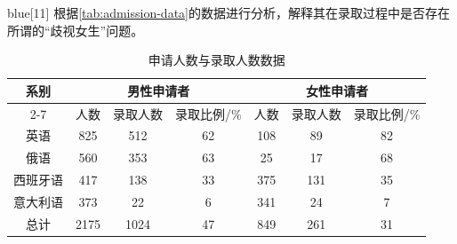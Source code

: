 \documentclass[12pt,onecolumn]{ctexrep}
\begin{document}
\vspace{1em}
\begin{mybox}{blue}{}[11]
    根据\autoref{tab:admission-data}的数据进行分析，解释其在录取过程中是否存在所谓的“歧视女生”问题。
\end{mybox}
\begin{table}[htbp]
    \centering
    \caption{申请人数与录取人数数据}
    \label{tab:admission-data}
    \renewcommand{\arraystretch}{1.4}
    \setlength{\tabcolsep}{8pt}
    \begin{tabular}{c|ccc|ccc}
        \hline
        \multirow{2}{*}{系别}
             & \multicolumn{3}{c|}{男性申请者}
             & \multicolumn{3}{c}{女性申请者}                                          \\
        \cline{2-7}
             & 人数                         & 录取人数 & 录取比例/\% & 人数  & 录取人数 & 录取比例/\% \\
        \hline
        英语   & 825                        & 512  & 62      & 108 & 89   & 82      \\
        俄语   & 560                        & 353  & 63      & 25  & 17   & 68      \\
        西班牙语 & 417                        & 138  & 33      & 375 & 131  & 35      \\
        意大利语 & 373                        & 22   & 6       & 341 & 24   & 7       \\
        \hline
        总计   & 2175                       & 1024 & 47      & 849 & 261  & 31      \\
        \hline
    \end{tabular}
\end{table}
\end{document}
